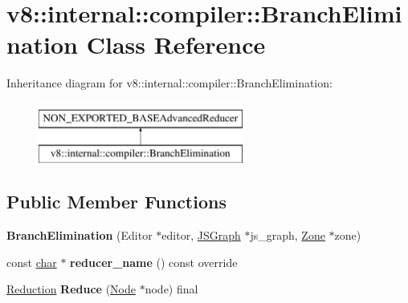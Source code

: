\hypertarget{classv8_1_1internal_1_1compiler_1_1BranchElimination}{}\section{v8\+:\+:internal\+:\+:compiler\+:\+:Branch\+Elimination Class Reference}
\label{classv8_1_1internal_1_1compiler_1_1BranchElimination}
Inheritance diagram for v8\+:\+:internal\+:\+:compiler\+:\+:Branch\+Elimination\+:\begin{figure}[H]
\begin{center}
\leavevmode
\includegraphics[height=2.000000cm]{classv8_1_1internal_1_1compiler_1_1BranchElimination}
\end{center}
\end{figure}
\subsection*{Public Member Functions}
\begin{DoxyCompactItemize}
\item 
\mbox{\label{classv8_1_1internal_1_1compiler_1_1BranchElimination_a49ff5c2473b3d3368e39bb24e9848457}} 
{\bfseries Branch\+Elimination} (Editor $\ast$editor, \mbox{\hyperlink{classv8_1_1internal_1_1compiler_1_1JSGraph}{J\+S\+Graph}} $\ast$js\+\_\+graph, \mbox{\hyperlink{classv8_1_1internal_1_1Zone}{Zone}} $\ast$zone)
\item 
\mbox{\label{classv8_1_1internal_1_1compiler_1_1BranchElimination_a12098ea7422109883784fda11d2a480a}} 
const \mbox{\hyperlink{classchar}{char}} $\ast$ {\bfseries reducer\+\_\+name} () const override
\item 
\mbox{\label{classv8_1_1internal_1_1compiler_1_1BranchElimination_a70c51071a0c2e78e9a4fe29725ef58a4}} 
\mbox{\hyperlink{classv8_1_1internal_1_1compiler_1_1Reduction}{Reduction}} {\bfseries Reduce} (\mbox{\hyperlink{classv8_1_1internal_1_1compiler_1_1Node}{Node}} $\ast$node) final
\end{DoxyCompactItemize}



